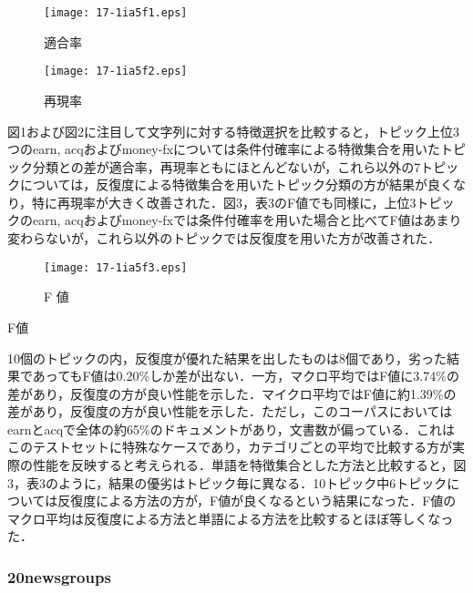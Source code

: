 \documentclass[japanese]{jnlp_1.4}
\begin{document}
\begin{figure}[b]
\begin{center}
\texttt{[image: 17-1ia5f1.eps]}
\end{center}
 \caption{適合率}
\end{figure}
\begin{figure}[b]
\begin{center}
\texttt{[image: 17-1ia5f2.eps]}
\end{center}
 \caption{再現率}
\end{figure}

図1および図2に注目して文字列に対する特徴選択を比較すると，トピック上位3つのearn, 
acqおよびmoney-fxについては条件付確率による特徴集合を用いたトピック分類との差が適合率，再現率ともにほとんどないが，これら以外の7トピックについては，反復度による特徴集合を用いたトピック分類の方が結果が良くなり，特に再現率が大きく改善された．図3，表3のF値でも同様に，上位3トピックのearn, 
acqおよびmoney-fxでは条件付確率を用いた場合と比べてF値はあまり変わらないが，これら以外のトピックでは反復度を用いた方が改善された．

\begin{figure}[t]
\begin{center}
\texttt{[image: 17-1ia5f3.eps]}
\end{center}
 \caption{F 値}
\end{figure}
\begin{table}[t]
\caption{F値}

\end{table}

10個のトピックの内，反復度が優れた結果を出したものは8個であり，劣った結果であってもF値は0.20{\%}しか差が出ない．一方，マクロ平均ではF値に3.74{\%}の差があり，反復度の方が良い性能を示した．マイクロ平均ではF値に約1.39{\%}の差があり，反復度の方が良い性能を示した．ただし，このコーパスにおいてはearnとacqで全体の約65{\%}のドキュメントがあり，文書数が偏っている．これはこのテストセットに特殊なケースであり，カテゴリごとの平均で比較する方が実際の性能を反映すると考えられる．単語を特徴集合とした方法と比較すると，図3，表3のように，結果の優劣はトピック毎に異なる．10トピック中6トピックについては反復度による方法の方が，F値が良くなるという結果になった．F値のマクロ平均は反復度による方法と単語による方法を比較するとほぼ等しくなった．



\subsubsection{20newsgroups}
\end{document}
